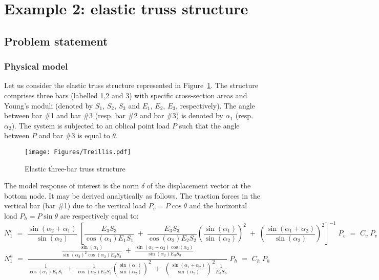\documentclass[11pt]{article}
\begin{document}
\newpage
\section{Example 2: elastic truss structure}

\subsection{Problem statement}

\subsubsection{Physical model}

Let us consider the elastic truss structure represented in Figure~\ref{fig_treillis}. The structure comprises three bars (labelled 1,2 and 3) with specific cross-section areas and Young's moduli (denoted by $S_1$, $S_2$, $S_3$ and $E_1$, $E_2$, $E_3$, respectively). The angle between bar \#1 and bar \#3 (resp. bar \#2 and bar \#3) is denoted by $\alpha_1$ (resp. $\alpha_2$). The system is subjected to an oblical point load $P$ such that the angle between $P$ and bar \#3 is equal to $\theta$.

\begin{figure}[Hhbtp]
  \begin{center}
    \texttt{[image: Figures/Treillis.pdf]}
  \end{center}
  \caption{Elastic three-bar truss structure}
  \label{fig_treillis}
\end{figure}



The model response of interest is the norm $\delta$ of the displacement vector at the bottom node. It may be derived analytically as follows. The traction forces in the vertical bar (bar \#1) due to the vertical load $P_v = P \cos \theta$ and the horizontal load $P_h = P \sin \theta$ are respectively equal to:
\begin{equation}
  N_1^v \, \, = \, \, \frac{\sin(\alpha_2 + \alpha_1)}{\sin(\alpha_2)} \;
  \left[ \frac{E_3 S_3}{\cos(\alpha_1) E_1 S_1} \; + \; \frac{E_3 S_3}{\cos(\alpha_2) E_2 S_2} \left( \frac{\sin(\alpha_1)}{\sin(\alpha_2)}\right)^2 \; + \;
    \left( \frac{\sin(\alpha_1 + \alpha_2)}{\sin(\alpha_2)}\right)^2 \right]^{-1}
  \; P_v \, \, = \, \, C_v \; P_v
\end{equation}
\begin{equation}
  N_1^h \, \, = \, \,
  \frac{ \frac{\sin(\alpha_1)}{\sin(\alpha_2)^2 \cos(\alpha_2) E_2 S_2}  \; + \; \frac{\sin(\alpha_1 + \alpha_2) \cos(\alpha_2)}{\sin(\alpha_2) E_3 S_3}     }
       { \frac{1}{\cos(\alpha_1) E_1 S_1} \; + \; \frac{1}{\cos(\alpha_2) E_2 S_2} \left( \frac{\sin(\alpha_1)}{\sin(\alpha_2)}\right)^2 \; + \;
         \left( \frac{\sin(\alpha_1 + \alpha_2)}{\sin(\alpha_2)}\right)^2  \frac{1}{E_3 S_3} }
       \; P_h \, \, = \, \, C_h \; P_h
\end{equation}
\end{document}
